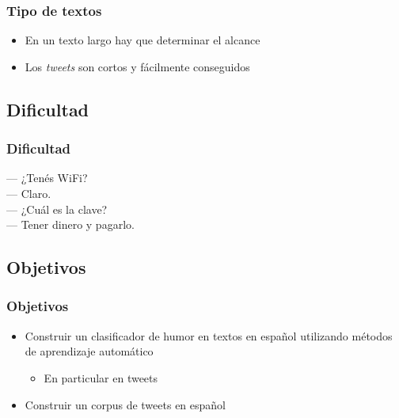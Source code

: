 \begin{frame}
    \frametitle{Tipo de textos}

    \begin{itemize}[<+->]
        \item En un texto largo hay que determinar el alcance
        \item Los \emph{tweets} son cortos y fácilmente conseguidos
    \end{itemize}
\end{frame}

\subsection{Dificultad}

\begin{frame}
    \frametitle{Dificultad}
    
    --- ¿Tenés WiFi? \\
    --- Claro. \\
    --- ¿Cuál es la clave? \\
    --- Tener dinero y pagarlo. \\
\end{frame}

\subsection{Objetivos}

\begin{frame}
    \frametitle{Objetivos}
    \begin{itemize}
        \item Construir un clasificador de humor en textos en español utilizando métodos de aprendizaje automático
            \begin{itemize}
                \item En particular en tweets
            \end{itemize}
        \item Construir un corpus de tweets en español
    \end{itemize}
\end{frame}
